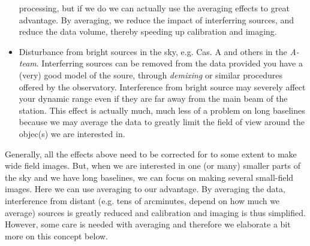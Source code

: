\begin{itemize}
processing, but if we do we can actually use the averaging effects to great
advantage. By averaging, we reduce the impact of interferring sources, and
reduce the data volume, thereby speeding up calibration and imaging. 
\item Disturbance from bright sources in the sky, e.g. Cas. A and others in the
\emph{A-team}. Interferring sources can be removed from the data provided you
have a (very) good model of the soure, through \emph{demixing} or similar
procedures offered by the observatory. Interference from bright source may
severely affect your dynamic range even if they are far away from the main beam
of the station. This effect is actually much, much less of a problem on long
baselines because we may average the data to greatly limit the field of view
around the objec(s) we are interested in.
\end{itemize}

Generally, all the effects above need to be corrected for to some extent to
make wide field images. But, when we are interested in one (or many) smaller
parts of the sky and we have long baselines, we can focus on making several
small-field images. Here we can use averaging to our advantage. By averaging
the data, interference from distant (e.g. tens of arcminutes, depend on how
much we average) sources is greatly reduced and calibration and imaging is thus
simplified.  However, some care is needed with averaging and therefore we
elaborate a bit more on this concept below. 


